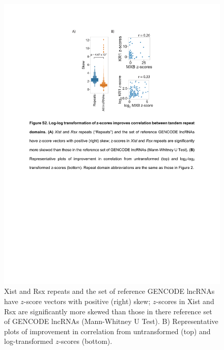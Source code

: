 \begin{figure}[h]
\centering
\includegraphics[width=\textwidth]{images/kmerskew.pdf}
\caption{Xist and Rsx repeats and the set of reference GENCODE lncRNAs have $z$-score vectors with positive (right) skew; $z$-scores in Xist and Rsx are significantly more skewed than those in there reference set of GENCODE lncRNAs (Mann-Whitney U Test). B) Representative plots of improvement in correlation from untransformed (top) and log-transformed $z$-scores (bottom).}
\label{fig:skew}
\end{figure}
